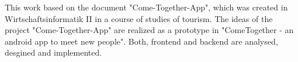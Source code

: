 This work based on the document "Come-Together-App", which was created in Wirtschaftsinformatik II in a course of studies of tourism. The ideas of the project "Come-Together-App"  are realized as a prototype in "ComeTogether - an android app to meet new people". Both, frontend and backend are analysed, desgined and implemented.
